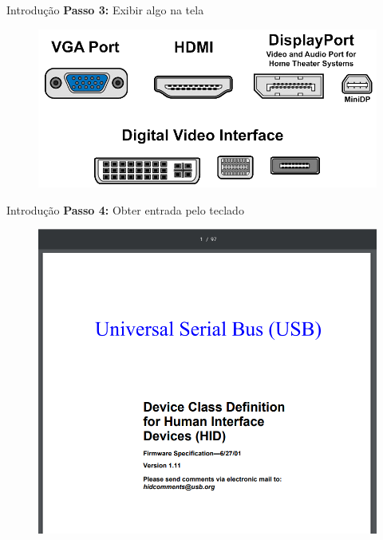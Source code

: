 \documentclass{beamer}
\begin{document}
\begin{frame}{Introdução}
	\textbf{Passo 3:} Exibir algo na tela
	\begin{figure}
		\includegraphics[width=0.6\paperwidth]{resources/video}
	\end{figure}
\end{frame}
\begin{frame}{Introdução}
	\textbf{Passo 4:} Obter entrada pelo teclado
	\begin{figure}
		\includegraphics[width=0.6\paperwidth]{resources/usb}
	\end{figure}
\end{frame}
\end{document}
